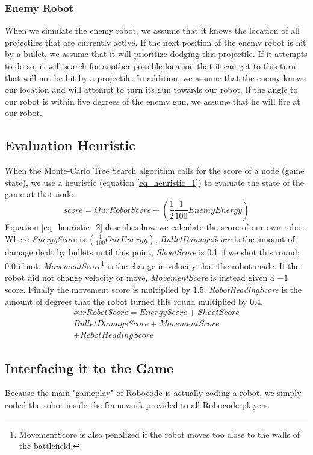 \subsubsection{Enemy Robot}
When we simulate the enemy robot, we assume that it knows the location of all projectiles that are currently active. If the next position of the enemy robot is hit by a bullet, we assume that it will prioritize dodging this projectile. If it attempts to do so, it will search for another possible location that it can get to this turn that will not be hit by a projectile. In addition, we assume that the enemy knows our location and will attempt to turn its gun towards our robot. If the angle to our robot is within five degrees of the enemy gun, we assume that he will fire at our robot.

\subsection{Evaluation Heuristic}
When the Monte-Carlo Tree Search algorithm calls for the score of a node (game state), we use a heuristic (equation \ref{eq_heuristic_1}) to evaluate the state of the game at that node. 
\begin{equation}
\label{eq_heuristic_1}
score = OurRobotScore +  \left(\frac{1}{2} \frac{1}{100} EnemyEnergy\right)
\end{equation}
Equation \ref{eq_heuristic_2} describes how we calculate the score of our own robot.
\\Where \textit{EnergyScore} is $\left(\frac{1}{100}OurEnergy\right)$, \textit{BulletDamageScore} is the amount of damage dealt by bullets until this point, \textit{ShootScore} is 0.1 if we shot this round; 0.0 if not. \textit{MovementScore}\footnote{MovementScore is also penalized if the robot moves too close to the walls of the battlefield.} is the change in velocity that the robot made. If the robot did not change velocity or move, \textit{MovementScore} is instead given a $-1$ score. Finally the movement score is multiplied by $1.5$. \textit{RobotHeadingScore} is the amount of degrees that the robot turned this round multiplied by 0.4.
\begin{equation}
\begin{split}
\label{eq_heuristic_2}
ourRobotScore = EnergyScore+ShootScore\\
BulletDamageScore+MovementScore\\
+RobotHeadingScore
\end{split}
\end{equation}

\subsection{Interfacing it to the Game}
Because the main "gameplay" of Robocode is actually coding a robot, we simply coded the robot inside the framework provided to all Robocode players.